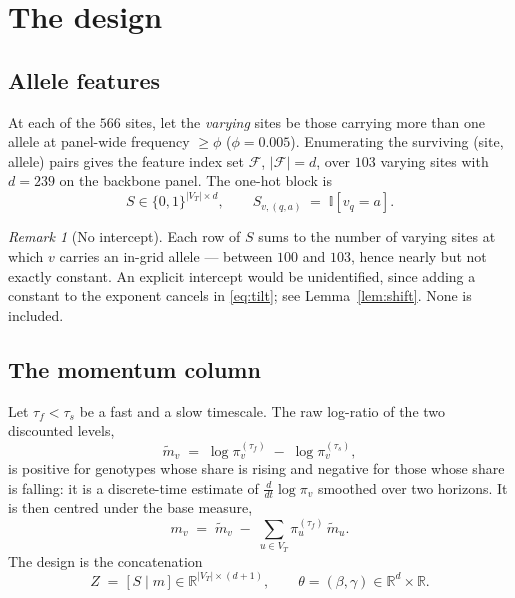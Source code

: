 \documentclass[11pt]{article}
\theoremstyle{remark}
\newtheorem{remark}{Remark}
\newcommand{\R}{\mathbb{R}}
\newcommand{\1}{\mathbf{1}}
\newcommand{\Ind}[1]{\mathbb{I}\!\left[#1\right]}
\newcommand{\VT}{V_T}
\begin{document}
\section{The design}

\subsection{Allele features}

At each of the $566$ sites, let the \emph{varying} sites be those carrying more than one
allele at panel-wide frequency $\ge \phi$ ($\phi = 0.005$). Enumerating the surviving
(site, allele) pairs gives the feature index set $\mathcal{F}$, $|\mathcal{F}| = d$, over
$103$ varying sites with $d = 239$ on the backbone panel. The one-hot block is
\begin{equation}
  S \in \{0,1\}^{|\VT| \times d},
  \qquad S_{v,(q,a)} \;=\; \Ind{v_q = a}.
\end{equation}

\begin{remark}[No intercept]
Each row of $S$ sums to the number of varying sites at which $v$ carries an in-grid
allele --- between $100$ and $103$, hence nearly but not exactly constant. An explicit
intercept would be unidentified, since adding a constant to the exponent cancels in
\eqref{eq:tilt}; see Lemma~\ref{lem:shift}. None is included.
\end{remark}

\subsection{The momentum column}

Let $\tau_f < \tau_s$ be a fast and a slow timescale. The raw log-ratio of the two
discounted levels,
\begin{equation}
  \tilde m_v \;=\; \log \pi^{(\tau_f)}_v \;-\; \log \pi^{(\tau_s)}_v,
\end{equation}
is positive for genotypes whose share is rising and negative for those whose share is
falling: it is a discrete-time estimate of $\tfrac{d}{dt}\log \pi_v$ smoothed over two
horizons. It is then centred under the base measure,
\begin{equation}
  m_v \;=\; \tilde m_v \;-\; \sum_{u \in \VT} \pi^{(\tau_f)}_u \, \tilde m_u .
  \label{eq:mom}
\end{equation}
The design is the concatenation
\begin{equation}
  Z \;=\; \bigl[\, S \;\big\vert\; m \,\bigr] \in \R^{|\VT| \times (d+1)},
  \qquad \theta = (\beta, \gamma) \in \R^{d} \times \R .
\end{equation}
\end{document}
